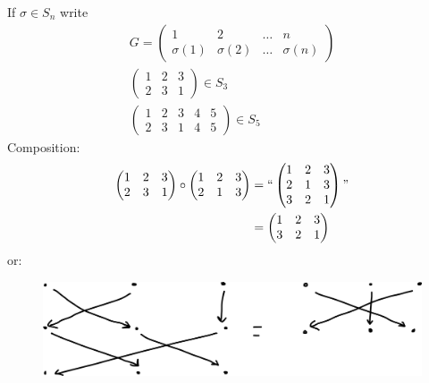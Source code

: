 If \(\sigma \in S_n\) write
\begin{align*}
    G = \begin{pmatrix}
    1 & 2 & \ldots & n \\
    \sigma(1) & \sigma(2) & \ldots & \sigma(n)
    \end{pmatrix} \\
    \begin{pmatrix}
    1 & 2 & 3 \\
    2 & 3 & 1
    \end{pmatrix} \in S_3 \\
    \begin{pmatrix}
    1 & 2 & 3 & 4 & 5 \\
    2 & 3 & 1 & 4 & 5
    \end{pmatrix} \in S_5
\end{align*}
Composition:
\begin{align*}
    \begin{pmatrix}
    1 & 2 & 3 \\
    2 & 3 & 1
    \end{pmatrix} \circ
    \begin{pmatrix}
    1 & 2 & 3 \\
    2 & 1 & 3
    \end{pmatrix}
    &= ``\begin{pmatrix}
    1 & 2 & 3 \\
    2 & 1 & 3 \\
    3 & 2 & 1
    \end{pmatrix}" \\
    &= \begin{pmatrix}
        1 & 2 & 3 \\
        3 & 2 & 1
    \end{pmatrix}
\end{align*}
or:

\begin{figure}

{\centering \includegraphics{figures/02-symmetric-graphical} 

}

\end{figure}

